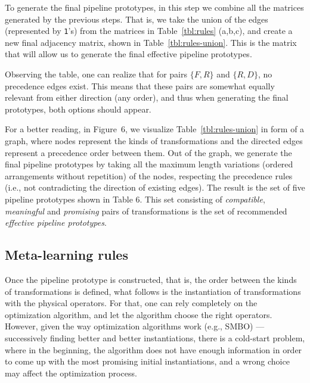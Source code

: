 \begin{example}
To generate the final pipeline prototypes, in this step we combine all the matrices generated by the previous steps. That is, we take the union of the edges (represented by \texttt{1}'s) from the matrices in Table~\ref{tbl:rules} (a,b,c), and create a new final adjacency matrix, shown in Table~\ref{tbl:rules-union}. This is the matrix that will allow us to generate the final effective pipeline prototypes. 

Observing the table, one can realize that for pairs $\{F,R\}$ and $\{R,D\}$, no precedence edges exist. This means that these pairs are somewhat equally relevant from either direction (any order), and thus when generating the final prototypes, both options should appear.

For a better reading, in Figure~6, we visualize Table~\ref{tbl:rules-union} in form of a graph, where nodes represent the kinds of transformations and the directed edges represent a precedence order between them.
Out of the graph, we generate the final pipeline prototypes by taking all the maximum length variations (ordered arrangements without repetition) of the nodes, respecting the precedence rules (i.e., not contradicting the direction of existing edges). The result is the set of five pipeline prototypes shown in Table 6. This set consisting of \textit{compatible}, \textit{meaningful} and \textit{promising} pairs of transformations is the set of recommended \textit{effective pipeline prototypes}.
\end{example}

\color{black}

\subsection{Meta-learning rules}
\label{effective-ssec:meta-learning}

Once the pipeline prototype is constructed, that is, the order between the kinds of transformations is defined, what follows is the instantiation of transformations with the physical operators. For that, one can rely completely on the optimization algorithm, and let the algorithm choose the right operators. However, given the way optimization algorithms work (e.g., SMBO) --- successively finding better and better instantiations, there is a cold-start problem, where in the beginning, the algorithm does not have enough information in order to come up with the most promising initial instantiations, and a wrong choice may affect the optimization process. 
